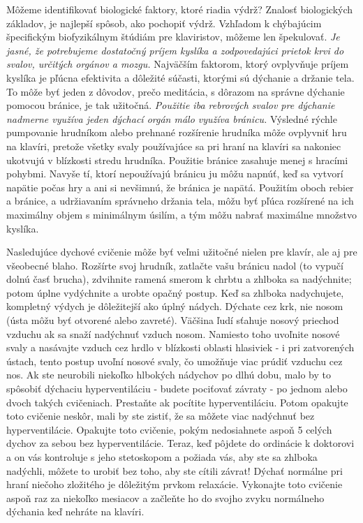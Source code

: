 Môžeme identifikovať biologické faktory, ktoré riadia výdrž? Znalosť biologických základov, je najlepší spôsob, ako pochopiť výdrž. Vzhľadom k chýbajúcim špecifickým biofyzikálnym štúdiám pre klaviristov, môžeme len špekulovať. \emph{Je jasné, že potrebujeme dostatočný príjem kyslíka a zodpovedajúci prietok krvi do svalov, určitých orgánov a mozgu.} Najväčším faktorom, ktorý ovplyvňuje príjem kyslíka je pľúcna efektivita a dôležité súčasti, ktorými sú dýchanie a držanie tela. To môže byť jeden z dôvodov, prečo meditácia, s dôrazom na správne dýchanie pomocou bránice, je tak užitočná. \emph{Použitie iba rebrových svalov pre dýchanie nadmerne využíva jeden dýchací orgán málo využíva bránicu.} Výsledné rýchle pumpovanie hrudníkom alebo prehnané rozšírenie hrudníka môže ovplyvniť hru na klavíri, pretože všetky svaly používajúce sa pri hraní na klavíri sa nakoniec ukotvujú v blízkosti stredu hrudníka. Použitie bránice zasahuje menej s hracími pohybmi. Navyše tí, ktorí nepoužívajú bránicu ju môžu napnúť, keď sa vytvorí napätie počas hry a ani si nevšimnú, že bránica je napätá. Použitím oboch rebier a bránice, a udržiavaním správneho držania tela, môžu byť pľúca rozšírené na ich maximálny objem s minimálnym úsilím, a tým môžu nabrať maximálne množstvo kyslíka.

Nasledujúce dychové cvičenie môže byť veľmi užitočné nielen pre klavír, ale aj pre všeobecné blaho. Rozšírte svoj hrudník, zatlačte vašu bránicu nadol (to vypučí dolnú časť brucha), zdvihnite ramená smerom k chrbtu a zhlboka sa nadýchnite; potom úplne vydýchnite a urobte opačný postup. Keď sa zhlboka nadychujete, kompletný výdych je dôležitejší ako úplný nádych. Dýchate cez krk, nie nosom (ústa môžu byť otvorené alebo zavreté). Väčšina ľudí sťahuje nosový priechod vzduchu ak sa snaží nadýchnuť vzduch nosom. Namiesto toho uvoľnite nosové svaly a nasávajte vzduch cez hrdlo v blízkosti oblasti hlasiviek - i pri zatvorených ústach, tento postup uvoľní nosové svaly, čo umožňuje  viac prúdiť vzduchu cez nos. Ak ste neurobili niekoľko hlbokých nádychov po dlhú dobu, malo by to spôsobiť dýchaciu hyperventiláciu - budete pociťovať závraty - po jednom alebo dvoch takých cvičeniach. Prestaňte ak pocítite hyperventiláciu. Potom opakujte toto cvičenie neskôr, mali by ste zistiť, že sa môžete viac nadýchnuť bez hyperventilácie. Opakujte toto cvičenie, pokým nedosiahnete  aspoň 5 celých dychov za sebou bez hyperventilácie. Teraz, keď pôjdete do ordinácie k doktorovi a on vás kontroluje s jeho stetoskopom a požiada vás, aby ste sa zhlboka nadýchli, môžete to urobiť bez toho, aby ste cítili závrat! Dýchať normálne pri hraní niečoho zložitého je dôležitým prvkom relaxácie. Vykonajte toto cvičenie aspoň raz za niekoľko mesiacov a začleňte ho do svojho zvyku normálneho dýchania keď nehráte na klavíri.

